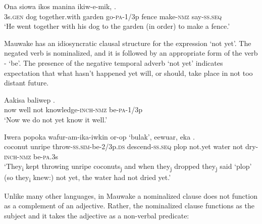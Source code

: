 \ea%
\label{ex:5:x1255}
\gll Ona  siowa  ikos  manina  ikiw-e-mik,   \textstyleEmphasizedVernacularWords{-} \textstyleEmphasizedVernacularWords{-}.
 \\
     3s.\textsc{gen}  dog  together.with  garden  go-\textsc{pa}-1/3p  fence make-\textsc{nmz}  say-\textsc{ss}.\textsc{seq} \\
\glt `He went together with his dog to the garden (in order) to make a fence.'
\z

Mauwake has an idiosyncratic clausal structure for the expression `not yet'. The negated verb is nominalized, and it is followed by an appropriate form of the verb - `be'.  The presence of the negative temporal adverb  `not yet' indicates expectation that what hasn't happened yet will, or should, take place in not too distant future.  

\ea%
\label{ex:5:x1254}
\gll Aakisa  baliwep    . \\
     now  well  not  knowledge-\textsc{inch}-\textsc{nmz}  be-\textsc{pa}-1/3p \\
\glt `Now we do not yet know it well.'
\z

\ea%
\label{ex:5:x1256}
\gll Iwera  popoka  wafur-am-ika-iwkin  or-op  `bulak', eewuar,  eka    . \\
     coconut  unripe  throw-\textsc{ss}.\textsc{sim}-be-2/3p.\textsc{ds}  descend-\textsc{ss}.\textsc{seq}  plop not.yet  water  not  dry-\textsc{inch}-\textsc{nmz}  be-\textsc{pa}.3s \\
\glt `They\textsubscript{i} kept throwing unripe coconuts\textsubscript{j} and when they\textsubscript{j} dropped they\textsubscript{j} said `plop' (so they\textsubscript{i} knew:) not yet, the water had not dried yet.'
\z

Unlike many other languages, in Mauwake a nominalized clause does not function as a complement of an adjective. Rather, the nominalized clause functions as the subject and it takes the adjective as a non-verbal predicate: 

